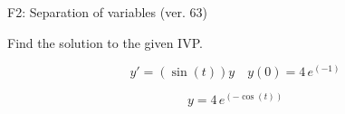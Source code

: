 \begin{exercise}
  \begin{exerciseTitle}F2: Separation of variables (ver. 63)\end{exerciseTitle}
  \begin{exerciseStatement}
    
Find the solution to the given IVP.

    
\[y'=( \sin\left(t\right) )y\hspace{1em} y(0)= 4 \, e^{\left(-1\right)}\]

  \end{exerciseStatement}
  \begin{exerciseAnswer}
    
\[y= 4 \, e^{\left(-\cos\left(t\right)\right)}\]

  \end{exerciseAnswer}
\end{exercise}